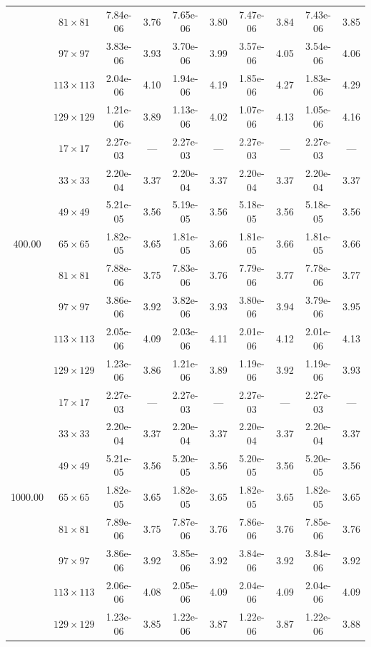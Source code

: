 \documentclass[preprint, 12pt]{elsarticle}
\begin{document}
\begin{center}
\begin{table}[H]
{\begin{tabular*}{\textwidth}{@{\extracolsep\fill}cccccccccc@{}}
    & $81\times 81$ & 7.84e-06 & 3.76 & 7.65e-06 & 3.80 & 7.47e-06 & 3.84 & 7.43e-06 & 3.85 \\
    & $97\times 97$ & 3.83e-06 & 3.93 & 3.70e-06 & 3.99 & 3.57e-06 & 4.05 & 3.54e-06 & 4.06 \\
    & $113\times 113$ & 2.04e-06 & 4.10 & 1.94e-06 & 4.19 & 1.85e-06 & 4.27 & 1.83e-06 & 4.29 \\
    & $129\times 129$ & 1.21e-06 & 3.89 & 1.13e-06 & 4.02 & 1.07e-06 & 4.13 & 1.05e-06 & 4.16 \\
    \hline\hline
    \multirow{7}{*}{400.00} & $17\times 17$ & 2.27e-03 & --- & 2.27e-03 & --- & 2.27e-03 & --- & 2.27e-03 & --- \\
    & $33\times 33$ & 2.20e-04 & 3.37 & 2.20e-04 & 3.37 & 2.20e-04 & 3.37 & 2.20e-04 & 3.37 \\
    & $49\times 49$ & 5.21e-05 & 3.56 & 5.19e-05 & 3.56 & 5.18e-05 & 3.56 & 5.18e-05 & 3.56 \\
    & $65\times 65$ & 1.82e-05 & 3.65 & 1.81e-05 & 3.66 & 1.81e-05 & 3.66 & 1.81e-05 & 3.66 \\
    & $81\times 81$ & 7.88e-06 & 3.75 & 7.83e-06 & 3.76 & 7.79e-06 & 3.77 & 7.78e-06 & 3.77 \\
    & $97\times 97$ & 3.86e-06 & 3.92 & 3.82e-06 & 3.93 & 3.80e-06 & 3.94 & 3.79e-06 & 3.95 \\
    & $113\times 113$ & 2.05e-06 & 4.09 & 2.03e-06 & 4.11 & 2.01e-06 & 4.12 & 2.01e-06 & 4.13 \\
    & $129\times 129$ & 1.23e-06 & 3.86 & 1.21e-06 & 3.89 & 1.19e-06 & 3.92 & 1.19e-06 & 3.93 \\
    \hline\hline
    \multirow{7}{*}{1000.00} & $17\times 17$ & 2.27e-03 & --- & 2.27e-03 & --- & 2.27e-03 & --- & 2.27e-03 & --- \\
    & $33\times 33$ & 2.20e-04 & 3.37 & 2.20e-04 & 3.37 & 2.20e-04 & 3.37 & 2.20e-04 & 3.37 \\
    & $49\times 49$ & 5.21e-05 & 3.56 & 5.20e-05 & 3.56 & 5.20e-05 & 3.56 & 5.20e-05 & 3.56 \\
    & $65\times 65$ & 1.82e-05 & 3.65 & 1.82e-05 & 3.65 & 1.82e-05 & 3.65 & 1.82e-05 & 3.65 \\
    & $81\times 81$ & 7.89e-06 & 3.75 & 7.87e-06 & 3.76 & 7.86e-06 & 3.76 & 7.85e-06 & 3.76 \\
    & $97\times 97$ & 3.86e-06 & 3.92 & 3.85e-06 & 3.92 & 3.84e-06 & 3.92 & 3.84e-06 & 3.92 \\
    & $113\times 113$ & 2.06e-06 & 4.08 & 2.05e-06 & 4.09 & 2.04e-06 & 4.09 & 2.04e-06 & 4.09 \\
    & $129\times 129$ & 1.23e-06 & 3.85 & 1.22e-06 & 3.87 & 1.22e-06 & 3.87 & 1.22e-06 & 3.88 \\
    \hline
    \end{tabular*}
}
\end{table}
\end{center}
\end{document}
